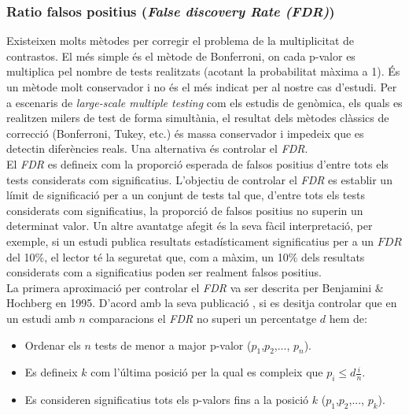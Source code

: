 \documentclass[english]{article}
\begin{document}
\subsubsection{Ratio falsos positius (\emph{False discovery Rate (FDR)})}
\label{2.2.1}
Existeixen molts mètodes per corregir el problema de la multiplicitat de contrastos. El més simple és el mètode de Bonferroni, on cada p-valor es multiplica pel nombre de tests realitzats (acotant la probabilitat màxima a 1). És un mètode molt conservador i no és el més indicat per al nostre cas d'estudi.
Per a escenaris de \textit{large-scale multiple testing} com els estudis de genòmica, els quals es realitzen milers de test de forma simultània, el resultat dels mètodes clàssics de correcció (Bonferroni, Tukey, etc.) és massa conservador i impedeix que es detectin diferències reals. Una alternativa és controlar el \emph{FDR}.
\\

El  \emph{FDR} es defineix com la proporció esperada de falsos positius d'entre tots els tests considerats com significatius. L'objectiu de controlar el \emph{FDR} es establir un límit de significació per a un conjunt de tests tal que, d'entre tots els tests considerats com significatius, la proporció de falsos positius no superin un determinat valor.
Un altre avantatge afegit és la seva fàcil interpretació, per exemple, si un estudi publica resultats estadísticament significatius per a un $FDR$ del 10$\%$, el lector té la seguretat que, com a màxim, un 10$\%$ dels resultats considerats com a significatius poden ser realment falsos positius.
\\
La primera aproximació per controlar el \emph{FDR} va ser descrita per Benjamini $\&$ Hochberg en 1995. D'acord amb la seva publicació \cite{fdr}, si es desitja controlar que en un estudi amb $n$ comparacions el \emph{FDR} no superi un percentatge $d$ hem de:

\begin{itemize}
\item Ordenar els $n$ tests de menor a major p-valor ($p_{1}$,$p_{2}$,..., $p_n$).
\item Es defineix $k$ com l'última posició per la qual es compleix que $p_i \leq d\frac{i}{n}$.
\item Es consideren significatius tots els p-valors fins a la posició $k$ ($p_{1}$,$p_{2}$,..., $p_k$).

\end{itemize}
\end{document}
